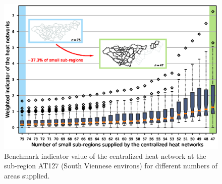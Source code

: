 \begin{figure}
	\centering
	\includegraphics[width=1\linewidth]{figures/4_Results/boxplot.eps}
	\caption{Benchmark indicator value of the centralized heat network at the sub-region AT127 (South Viennese environs) for different numbers of areas supplied.}
	\label{fig:res3}
\end{figure}


